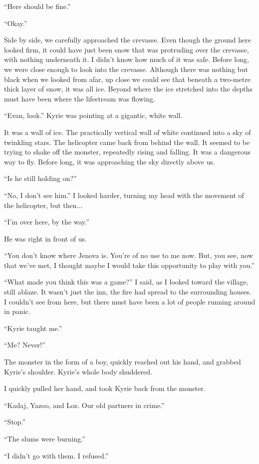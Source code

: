 \documentclass[oneside]{book}
\begin{document}
“Here should be fine.”

“Okay.”

Side by side, we carefully approached the crevasse. Even though the ground here looked firm, it could have just been snow that was protruding over the crevasse, with nothing underneath it. I didn’t know how much of it was safe. Before long, we were close enough to look into the crevasse. Although there was nothing but black when we looked from afar, up close we could see that beneath a two-metre thick layer of snow, it was all ice. Beyond where the ice stretched into the depths must have been where the lifestream was flowing.

“Evan, look.” Kyrie was pointing at a gigantic, white wall.

It was a wall of ice. The practically vertical wall of white continued into a sky of twinkling stars. The helicopter came back from behind the wall. It seemed to be trying to shake off the monster, repeatedly rising and falling. It was a dangerous way to fly. Before long, it was approaching the sky directly above us.

“Is he still holding on?”

“No, I don’t see him.” I looked harder, turning my head with the movement of the helicopter, but then...

“I’m over here, by the way.”

He was right in front of us.

“You don’t know where Jenova is. You’re of no use to me now. But, you see, now that we’ve met, I thought maybe I would take this opportunity to play with you.”

“What made you think this was a game?” I said, as I looked toward the village, still ablaze. It wasn’t just the inn, the fire had spread to the surrounding houses. I couldn’t see from here, but there must have been a lot of people running around in panic.

“Kyrie taught me.”

“Me? Never!”

The monster in the form of a boy, quickly reached out his hand, and grabbed Kyrie’s shoulder. Kyrie’s whole body shuddered.

I quickly pulled her hand, and took Kyrie back from the monster.

“Kadaj, Yazoo, and Loz. Our old partners in crime.”

“Stop.”

“The slums were burning.”

“I didn’t go with them. I refused.”
\end{document}
